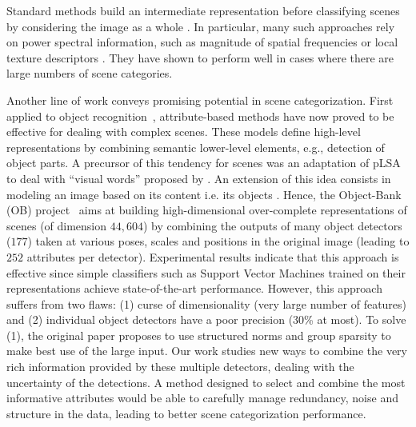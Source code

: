 \documentclass[runningheads,a4paper]{llncs}
\begin{document}
Standard methods build an intermediate representation before
classifying scenes by considering the image as a whole
\cite{Torralba03,Vogel:2004,FeiFei:2005,Oliva06}. In particular, many
such approaches rely on power spectral information, such as
magnitude of spatial frequencies \cite{Oliva06} or local texture
descriptors \cite{FeiFei:2005}.
%
They have shown to perform well in cases where there are large
numbers of scene categories.

Another line of work conveys promising potential in scene categorization.
%
First applied to object recognition~\cite{Farhadi:2009}, attribute-based
methods have now proved to be effective for dealing with complex scenes.
%
These models define high-level representations by combining semantic
lower-level elements, e.g., detection of object parts.
%
A precursor of this tendency for scenes was an adaptation of
pLSA~\cite{Hofmann:2001} to deal with ``visual words'' proposed by
\cite{Bosh:2006}. 
%
An extension of this idea consists in modeling an image based on its content
i.e. its objects \cite{Espinace10ICRA,LiJiaLi10}. Hence, the Object-Bank (OB)
project~\cite{LiSuLimFeiFei} aims at building high-dimensional over-complete
representations of scenes (of dimension $44,604$) by combining the outputs of
many object detectors ($177$) taken at various poses, scales and positions in
the original image (leading to $252$ attributes per detector).
%
Experimental results indicate that this approach is effective since simple
classifiers such as Support Vector Machines trained on their representations
achieve state-of-the-art performance.
%
However, this approach suffers from two flaws: (1) curse of dimensionality
(very large number of features) and (2) individual object detectors have a poor
precision (30\% at most).
%
%
To solve (1), the original paper proposes to use structured norms and group
sparsity to make best use of the large input.
%
%
Our work studies new ways to combine the very rich information provided by
these multiple detectors, dealing with the uncertainty of the detections.
%
A method designed to select and combine the most informative attributes would
be able to carefully manage redundancy, noise and structure in the data,
leading to better scene categorization performance.
\end{document}
